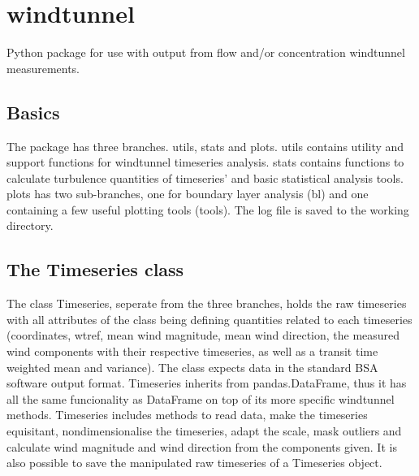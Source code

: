\documentclass[letterpaper,10pt,english]{sphinxmanual}
\begin{document}
\chapter{windtunnel}
\label{\detokenize{readme_link:windtunnel}}\label{\detokenize{readme_link::doc}}
Python package for use with output from flow and/or concentration windtunnel measurements.


\section{Basics}
\label{\detokenize{readme_link:basics}}
The package has three branches. utils, stats and plots. utils contains utility and support functions for windtunnel timeseries analysis. stats contains functions to calculate turbulence quantities of timeseries’ and basic statistical analysis tools. plots has two sub-branches, one for boundary layer analysis (bl) and one containing a few useful plotting tools (tools). The log file is saved to the working directory.


\section{The Timeseries class}
\label{\detokenize{readme_link:the-timeseries-class}}
The class Timeseries, seperate from the three branches, holds the raw timeseries with all attributes of the class being defining quantities related to each timeseries (coordinates, wtref, mean wind magnitude, mean wind direction, the measured wind components with their respective timeseries, as well as a transit time weighted mean and variance). The class expects data in the standard BSA software output format. Timeseries inherits from pandas.DataFrame, thus it has all the same funcionality as DataFrame on top of its more specific windtunnel methods. Timeseries includes methods to read data, make the timeseries equisitant, nondimensionalise the timeseries, adapt the scale, mask outliers and calculate wind magnitude and wind direction from the components given. It is also possible to save the manipulated raw timeseries of a Timeseries object.
\end{document}
